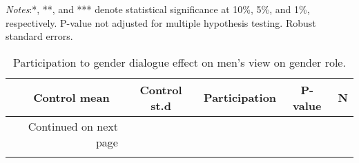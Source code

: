 \documentclass[10pt,a4paper, margin=1in]{article}
\begin{document}
\begin{center}
	{\tiny \tabcolsep=1pt  %
		\begin{ThreePartTable}
			\begin{TableNotes}[flushleft]
				\tiny
				\item \textit{Notes}:*, **, and *** denote statistical significance at 10\%, 5\%, and 1\%, respectively. P-value not adjusted for multiple hypothesis testing. Robust standard errors.
			\end{TableNotes}
			\begin{longtable}{l*{5}{c}}
				\caption{Participation to gender dialogue effect on men's view on gender role.}\label{tab:balance_omni}					\\
				\toprule
				\hline 
				&\multicolumn{1}{p{1cm}}{\centering Control mean}
				&\multicolumn{1}{p{1cm}}{\centering Control st.d}
				&\multicolumn{1}{p{2cm}}{\centering Participation}
				&\multicolumn{1}{p{1cm}}{\centering P-value}
				&\multicolumn{1}{p{1cm}}{\centering N} \\
				\hline 
				\endfirsthead
				\hline
				\endhead
				\hline
				\multicolumn{2}{r}{{Continued on next page}} \\
				\endfoot
				
				\bottomrule
				\insertTableNotes
				\endlastfoot
				
			\end{longtable}
		\end{ThreePartTable}
	}
\end{center}
\end{document}
